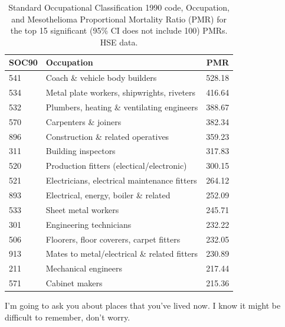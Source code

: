 \documentclass[a4paper,10pt]{article}
\begin{document}
\begin{table}
    \begin{tabular}{llr}
    \textbf{SOC90} &                                     \textbf{Occupation} &    \textbf{PMR} \\
    \midrule
        541 &                      Coach \& vehicle body builders &  528.18 \\
        534 &          Metal plate workers, shipwrights, riveters &  416.64 \\
        532 &         Plumbers, heating \& ventilating engineers  &  388.67 \\
        570 &                               Carpenters \& joiners &  382.34 \\ 
        896 &                  Construction \& related operatives &  359.23 \\
        311 &                                 Building inspectors &  317.83 \\  
        520 &           Production fitters (electical/electronic) &  300.15 \\
        521 &        Electricians, electrical maintenance fitters &  264.12 \\
        893 &  Electrical, energy, boiler \& related              &  252.09 \\
        533 &                                 Sheet metal workers &  245.71 \\
        301 &    Engineering technicians                          &  232.22 \\
        506 &            Floorers, floor coverers, carpet fitters &  232.05 \\
        913 &        Mates to metal/electrical \& related fitters &  230.89 \\
        211 &                                Mechanical engineers &  217.44 \\
        571 &                                      Cabinet makers &  215.36 \\ 
        \bottomrule
    \end{tabular}
    \caption{Standard Occupational Classification 1990 code, Occupation, and Mesothelioma Proportional Mortality Ratio (PMR) for the top 15 significant (95\% CI does not include 100) PMRs. HSE data.}
    \label{table:top15pmr}
\end{table}

I'm going to ask you about places that you've lived now. I know it might be difficult to remember, don't worry. 
\end{document}
